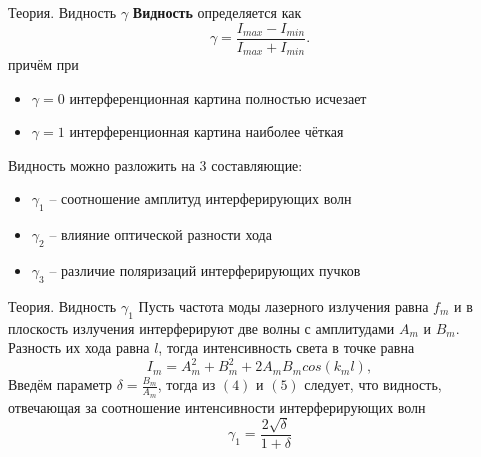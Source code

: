 \documentclass[11pt]{beamer} %
\begin{document}
    \begin{frame}{Теория. Видность $\gamma$}
        \textbf{Видность} определяется как
        \begin{equation}
            \gamma = \frac{I_{max} - I_{min}}{I_{max} + I_{min}}.
        \end{equation}
        причём при 
        \begin{itemize}
            \item $\gamma = 0$ интерференционная картина полностью исчезает
            \item $\gamma = 1$ интерференционная картина наиболее чёткая
        \end{itemize}
        Видность можно разложить на $3$ составляющие:
        \begin{itemize}
            \item $\gamma_1$ -- соотношение амплитуд интерферирующих волн
            \item $\gamma_2$ -- влияние оптической разности хода
            \item $\gamma_3$ -- различие поляризаций интерферирующих пучков
        \end{itemize}
    \end{frame}

    \begin{frame}{Теория. Видность $\gamma_1$}
        Пусть частота моды лазерного излучения равна $f_m$ и в плоскость излучения интерферируют две волны с амплитудами $A_m$ и $B_m$. Разность их хода равна $l$, тогда интенсивность света в точке равна 
        \begin{equation}
            I_m = A_m^2 + B_m^2 + 2A_mB_m cos(k_m l),
        \end{equation}
        Введём параметр $\delta = \frac{B_m}{A_m}$, тогда из $(4)$ и $(5)$ следует, что видность, отвечающая за соотношение интенсивности интерферирующих волн
        \begin{equation}
            \gamma_1 = \frac{2\sqrt{\delta}}{1 + \delta}
        \end{equation}
    \end{frame}
\end{document}
